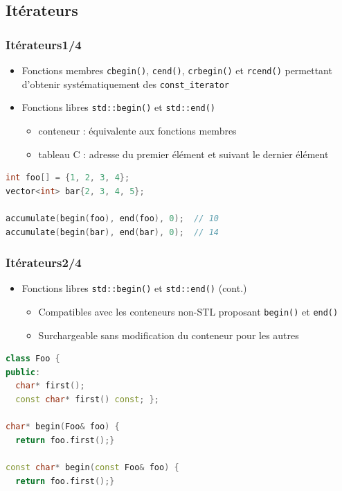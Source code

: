 \documentclass[C++.tex]{subfiles}
\begin{document}
\subsection*{Itérateurs}
\begin{frame}[fragile]
	\frametitle{Itérateurs\titlehfill{}1/4}
	\begin{itemize}
		\item Fonctions membres \lstinline|cbegin()|, \lstinline|cend()|, \lstinline|crbegin()| et \lstinline|rcend()| permettant d'obtenir systématiquement des \lstinline|const_iterator|


		\item Fonctions libres \lstinline|std::begin()| et \lstinline|std::end()|
		\begin{itemize}
			\item conteneur : équivalente aux fonctions membres
			\item tableau C : adresse du premier élément et suivant le dernier élément
		\end{itemize}
	\end{itemize}

	\begin{lstlisting}[language=C++]
int foo[] = {1, 2, 3, 4};
vector<int> bar{2, 3, 4, 5};

accumulate(begin(foo), end(foo), 0);  // 10
accumulate(begin(bar), end(bar), 0);  // 14\end{lstlisting}
\end{frame}

\begin{frame}[fragile]
	\frametitle{Itérateurs\titlehfill{}2/4}
	\begin{itemize}
		\item Fonctions libres \lstinline|std::begin()| et \lstinline|std::end()| (cont.)
		\begin{itemize}
			\item Compatibles avec les conteneurs non-STL proposant \lstinline|begin()| et \lstinline|end()|
			\item Surchargeable sans modification du conteneur pour les autres

		\end{itemize}
	\end{itemize}

	\begin{lstlisting}[language=C++]
class Foo {
public:
  char* first();
  const char* first() const; };

char* begin(Foo& foo) {
  return foo.first();}

const char* begin(const Foo& foo) {
  return foo.first();}\end{lstlisting}
\end{frame}
\end{document}
